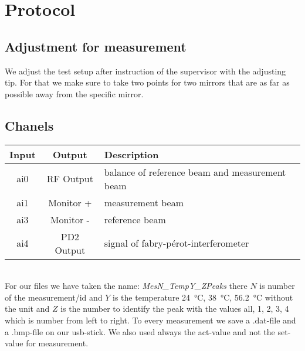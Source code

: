 
\chapter{Protocol}
\label{chap:protocol}

\section*{Adjustment for measurement}
We adjust the test setup after instruction of the supervisor with the adjusting tip. For that we make sure to take two points for two mirrors that are as far as possible away from the specific mirror.

\section*{Chanels}

\begin{tabular}[]{c|c|l}
    Input & Output & Description\\
    \hline
    ai0 & RF Output & balance of reference beam and measurement beam\\
    ai1 & Monitor + & measurement beam\\
    ai3 & Monitor - & reference beam\\
    ai4 & PD2 Output & signal of fabry-pérot-interferometer\\
\end{tabular}\\

For our files we have taken the name: \textit{MesN\_TempY\_ZPeaks} there $N$ is number of the measurement/id and $Y$ is the temperature \SI{24}{\celsius}, \SI{38}{\celsius}, \SI{56,2}{\celsius} without the unit and $Z$ is the number to identify the peak with the values all, 1, 2, 3, 4 which is number from left to right.
To every measurement we save a .dat-file and a .bmp-file on our usb-stick.
We also used always the act-value and not the set-value for measurement.

